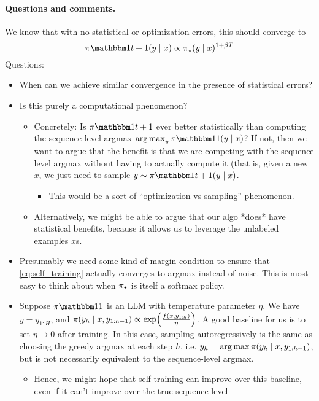 \documentclass{article}
\newcommand{\dfc}[1]{\dfcomment{#1}}
\let\oldparagraph\paragraph
\renewcommand{\paragraph}[1]{\oldparagraph{#1.}}
\begin{document}
\paragraph{Questions and comments}
We know that with no statistical or optimization errors, this
  should converge to
  \[
    \pi\ind{t+1}(y\mid{}x)\propto{}\pistar(y\mid{}x)^{1+\beta{}T}
  \]
  \dfc{Check this!}
  Questions:
\begin{itemize}
\item When can we achieve similar convergence in the presence of
  statistical errors?
\item Is this purely a computational phenomenon?
  \begin{itemize}
  \item Concretely: Is $\pi\ind{t+1}$ ever better statistically than
    computing the sequence-level argmax
    $\argmax_{y}\pi\ind{1}(y\mid{}x)$? If not, then we want to argue
    that the benefit is that we are competing with the sequence level
    argmax without having to actually compute it (that is, given a new
    $x$, we just need to sample $y\sim{}\pi\ind{t+1}(y\mid{}x)$.
    \begin{itemize}
    \item This would be a sort of ``optimization vs sampling'' phenomenon.
    \end{itemize}
  \item Alternatively, we might be able to argue that our algo *does*
    have statistical benefits, because it allows us to leverage the
    unlabeled examples $x$s.
  \end{itemize}
\item Presumably we need some kind of margin condition to ensure that
  \cref{eq:self_training} actually converges to argmax instead of
  noise. This is most easy to think about when $\pi_{\star}$ is itself a
  softmax policy.
\item Suppose $\pi\ind{1}$ is an LLM with temperature parameter
  $\eta$. We have $y=y_{1:H}$, and
  $\pi(y_h\mid{}x,y_{1:h-1})\propto\exp\prn*{\frac{f(x,y_{1:h})}{\eta}}$. A
  good baseline for us is to set $\eta\to{}0$ after training. In this
  case, sampling autoregressively is the same as choosing the greedy
  argmax at each step $h$,
  i.e. $y_h=\operatorname*{arg\,max}{}\pi(y_h\mid{}x,y_{1:h-1})$, but is not
  necessarily equivalent to the sequence-level argmax.
  \begin{itemize}
  \item Hence, we might hope that self-training can improve over this
    baseline, even if it can't improve over the true sequence-level

\end{itemize}
\end{itemize}
\end{document}
